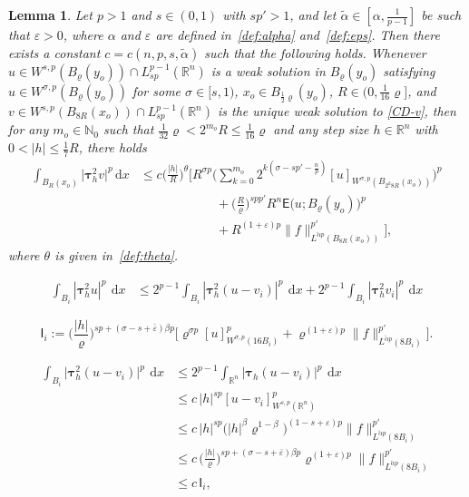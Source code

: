 \documentclass[10pt,a4paper]{amsart}
\newtheorem{lemma}{Lemma}
\renewcommand{\d}{\:\! \mathrm{d}}
\newcommand{\dx}{\mathrm{d}x}
\renewcommand{\epsilon}{\varepsilon}
\renewcommand{\rho}{\varrho}
\newcommand\sfE{{\boldsymbol{\mathsf E}}}
\newcommand\sfI{{\boldsymbol{\mathsf I}}}
\begin{document}
\begin{lemma}\label{lem:vi}
Let $p>1$ and $s\in(0,1)$ with $sp'>1$, and let $\tilde\alpha\in[\alpha,\frac{1}{p-1}]$ be such that $\epsilon>0$, where $\alpha$ and $\epsilon$ are defined in~\eqref{def:alpha} and~\eqref{def:eps}. 
Then there exists a constant $c=c(n,p,s,\tilde\alpha)$ such that the following holds.
Whenever
\(u \in W^{s,p}(B_\rho(y_o))\cap L^{p-1}_{sp}(\mathbb{R}^n)\)
is a weak solution in \(B_\rho(y_o)\) satisfying 
\(u \in W^{\sigma,p}(B_\rho(y_o))\) for some \(\sigma\in[s,1)\), 
\(x_o\in B_{\frac12 \rho}(y_o)\),  \(R\in(0,\frac1{16}\rho]\),
and
\(v \in W^{s,p}(B_{8R}(x_o))\cap L^{p-1}_{sp}(\mathbb{R}^n)\)
is the unique weak solution to \eqref{CD-v},
then for any \(m_o\in\mathbb{N}_0\) such that
\(\tfrac{1}{32}\rho<2^{m_o}R\le\tfrac{1}{16}\rho\) and any
step size \(h\in\mathbb{R}^n\) with \(0<|h|\le \tfrac17 R\), there holds
\begin{align*}
    \int_{B_R(x_o)} \big|\boldsymbol{\tau}_h^2 v\big|^p \,\dx
    &\le
    c \Big(\frac{|h|}{R}\Big)^{\theta}
    \Bigg[
        R^{\sigma p}
        \Bigg(
            \sum_{k=0}^{m_o}
            2^{k(\sigma-sp' - \frac{n}{p})}
            [u]_{W^{\sigma,p}(B_{2^k 8R}(x_o))}
        \Bigg)^p \\
    &\qquad\qquad\qquad
        + \Big(\frac{R}{\rho}\Big)^{spp'} R^n\sfE\big(u;B_\rho(y_o)\big)^p \\
    &\qquad\qquad\qquad + 
        R^{(1+\epsilon)p}
        \|f\|_{L^{\tilde\alpha p}(B_{8R}(x_o))}^{p'}
    \Bigg],
\end{align*}
where $\theta$ is given in~\eqref{def:theta}.
\end{lemma}

\begin{align}\label{Eq:tau-h-B-i}
    \int_{B_i} |\boldsymbol\tau_h^2 u|^p \,\d x
    &\le
    2^{p-1}\int_{B_i} |\boldsymbol\tau_h^2 (u - v_i)|^p \,\d x
    + 2^{p-1}\int_{B_i} |\boldsymbol\tau_h^2 v_i|^p \,\d x 
\end{align}

\begin{equation}\label{def:Ii}
    \sfI_i
    :=
    \Big(\frac{|h|}{\rho}\Big)^{sp+(\sigma-s+\bar\epsilon)\beta p} 
    \Big[ \rho^{\sigma p} [u]_{W^{\sigma,p}(16B_i)}^p +
    \rho^{(1+\epsilon)p}
    \|f\|_{L^{\tilde\alpha p}(8B_i)}^{p'}\Big]. 
\end{equation}

\begin{align}\label{change-1}
    \int_{B_i} \big|\boldsymbol\tau_h^2 (u - v_i)\big|^p \,\d x
    &\le
    2^{p-1}\int_{\mathbb{R}^n} \big|\boldsymbol\tau_h (u - v_i)\big|^p \,\d x \nonumber\\
    &\le
    c\, |h|^{sp} [u-v_i]_{W^{s,p}(\mathbb{R}^n)}^p \nonumber\\
    &\le
    c\, |h|^{sp} \big(|h|^\beta\rho^{1-\beta}\big)^{(1-s+\epsilon)p}
    \|f\|_{L^{\tilde\alpha p}(8B_i)}^{p'} \nonumber\\
    &\le 
    c\, \Big(\frac{|h|}{\rho}\Big)^{sp+(\sigma-s+\bar\epsilon)\beta p} \rho^{(1+\epsilon)p}
    \|f\|_{L^{\tilde\alpha p}(8B_i)}^{p'} \nonumber\\
    &\le  
    c\,\sfI_i ,
\end{align}
\end{document}
